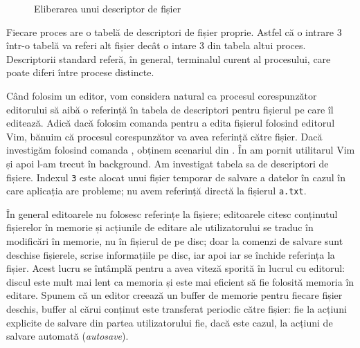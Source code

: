\begin{figure}[!htbp]
  \centering
  \def\svgwidth{0.8\textwidth}
  
  \caption{Eliberarea unui descriptor de fișier}
  \label{fig:process:free-fd}
\end{figure}

Fiecare proces are o tabelă de descriptori de fișier proprie.
Astfel că o intrare 3 într-o tabelă va referi alt fișier decât o intare 3 din tabela altui proces.
Descriptorii standard referă, în general, terminalul curent al procesului, care poate diferi între procese distincte.

Când folosim un editor, vom considera natural ca procesul corespunzător editorului să aibă o referință în tabela de descriptori pentru fișierul pe care îl editează.
Adică dacă folosim comanda  pentru a edita fișierul  folosind editorul Vim, bănuim că procesul corespunzător va avea referință către fișier.
Dacă investigăm folosind comanda , obținem scenariul din .
În  am pornit utilitarul Vim și apoi l-am trecut în background.
Am investigat tabela sa de descriptori de fișiere.
Indexul \texttt{3} este alocat unui fișier temporar de salvare a datelor în cazul în care aplicația are probleme;
nu avem referință directă la fișierul \texttt{a.txt}.


În general editoarele nu folosesc referințe la fișiere;
editoarele citesc conținutul fișierelor în memorie și acțiunile de editare ale utilizatorului se traduc în modificări în memorie, nu în fișierul de pe disc;
doar la comenzi de salvare sunt deschise fișierele, scrise informațiile pe disc, iar apoi iar se închide referința la fișier.
Acest lucru se întâmplă pentru a avea viteză sporită în lucrul cu editorul: discul este mult mai lent ca memoria și este mai eficient să fie folosită memoria în editare.
Spunem că un editor creează un buffer de memorie pentru fiecare fișier deschis, buffer al cărui conținut este transferat periodic către fișier: fie la acțiuni explicite de salvare din partea utilizatorului fie, dacă este cazul, la acțiuni de salvare automată (\textit{autosave}).

